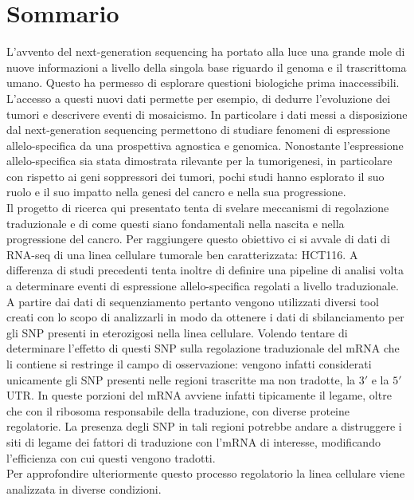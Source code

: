 \chapter*{Sommario} %
\label{sommario}

L'avvento del next-generation sequencing ha portato alla luce una grande mole di nuove informazioni a livello della singola base riguardo il genoma e il trascrittoma umano.
Questo ha permesso di esplorare questioni biologiche prima inaccessibili.
L'accesso a questi nuovi dati permette per esempio, di dedurre l'evoluzione dei tumori e descrivere eventi di mosaicismo.
In particolare i dati messi a disposizione dal next-generation sequencing permettono di studiare fenomeni di espressione allelo-specifica da una prospettiva agnostica e genomica.
Nonostante l'espressione allelo-specifica sia stata dimostrata rilevante per la tumorigenesi, in particolare con rispetto ai geni soppressori dei tumori, pochi studi hanno esplorato il suo ruolo e il suo impatto nella genesi del cancro e nella sua progressione.\\[12pt]
Il progetto di ricerca qui presentato tenta di svelare meccanismi di regolazione traduzionale e di come questi siano fondamentali nella nascita e nella progressione del cancro.
Per raggiungere questo obiettivo ci si avvale di dati di RNA-seq di una linea cellulare tumorale ben caratterizzata: HCT116.
A differenza di studi precedenti tenta inoltre di definire una pipeline di analisi volta a determinare eventi di espressione allelo-specifica regolati a livello traduzionale.
A partire dai dati di sequenziamento pertanto vengono utilizzati diversi tool creati con lo scopo di analizzarli in modo da ottenere i dati di sbilanciamento per gli SNP presenti in eterozigosi nella linea cellulare.
Volendo tentare di determinare l'effetto di questi SNP sulla regolazione traduzionale del mRNA che li contiene si restringe il campo di osservazione: vengono infatti considerati unicamente gli SNP presenti nelle regioni trascritte ma non tradotte, la $3'$ e la $5'$ UTR.
In queste porzioni del mRNA avviene infatti tipicamente il legame, oltre che con il ribosoma responsabile della traduzione, con diverse proteine regolatorie.
La presenza degli SNP in tali regioni potrebbe andare a distruggere i siti di legame dei fattori di traduzione con l'mRNA di interesse, modificando l'efficienza con cui questi vengono tradotti.\\
Per approfondire ulteriormente questo processo regolatorio la linea cellulare viene analizzata in diverse condizioni.

